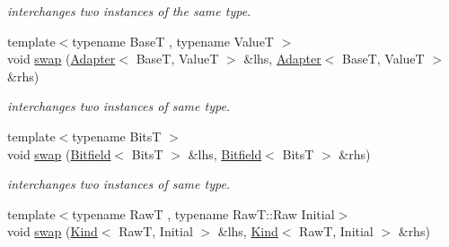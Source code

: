 \begin{DoxyCompactItemize}
\begin{DoxyCompactList}\small\item\em interchanges two instances of the same type. \end{DoxyCompactList}\item 
{\footnotesize template$<$typename Base\-T , typename Value\-T $>$ }\\void \hyperlink{namespacehryky_a4282146df5ea2b68cb667896a2205909}{swap} (\hyperlink{classhryky_1_1_adapter}{Adapter}$<$ Base\-T, Value\-T $>$ \&lhs, \hyperlink{classhryky_1_1_adapter}{Adapter}$<$ Base\-T, Value\-T $>$ \&rhs)
\begin{DoxyCompactList}\small\item\em interchanges two instances of same type. \end{DoxyCompactList}\item 
{\footnotesize template$<$typename Bits\-T $>$ }\\void \hyperlink{namespacehryky_aceca391630a418ef4d4abb33e68458c9}{swap} (\hyperlink{classhryky_1_1_bitfield}{Bitfield}$<$ Bits\-T $>$ \&lhs, \hyperlink{classhryky_1_1_bitfield}{Bitfield}$<$ Bits\-T $>$ \&rhs)
\begin{DoxyCompactList}\small\item\em interchanges two instances of same type. \end{DoxyCompactList}\item 
\hypertarget{namespacehryky_a38b65dba4a76741a904282b0e41424e5}{{\footnotesize template$<$typename Raw\-T , typename Raw\-T\-::\-Raw Initial$>$ }\\void \hyperlink{namespacehryky_a38b65dba4a76741a904282b0e41424e5}{swap} (\hyperlink{classhryky_1_1_kind}{Kind}$<$ Raw\-T, Initial $>$ \&lhs, \hyperlink{classhryky_1_1_kind}{Kind}$<$ Raw\-T, Initial $>$ \&rhs)}\label{namespacehryky_a38b65dba4a76741a904282b0e41424e5}


\end{DoxyCompactItemize}
